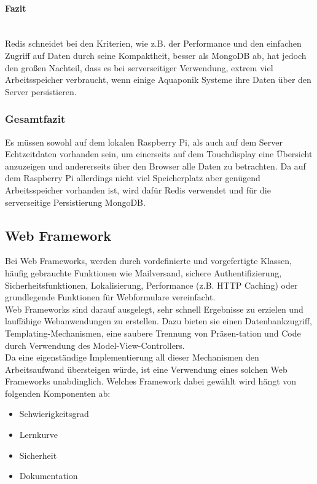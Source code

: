 \paragraph{Fazit} \mbox{}\\
Redis schneidet bei den Kriterien, wie z.B. der Performance und den einfachen Zugriff auf Daten durch
seine Kompaktheit, besser als MongoDB ab, hat jedoch den gro{\ss}en Nachteil, dass es bei serverseitiger Verwendung, extrem viel Arbeitsspeicher verbraucht, wenn einige Aquaponik Systeme ihre Daten \"uber den Server persistieren.

\subsubsection{Gesamtfazit}
Es m\"ussen sowohl auf dem lokalen Raspberry Pi, als auch auf dem Server Echtzeitdaten vorhanden sein, um einerseits auf dem Touchdisplay eine \"Ubersicht anzuzeigen und andererseits \"uber den Browser alle Daten zu betrachten. Da auf dem Raspberry Pi allerdings nicht viel Speicherplatz aber gen\"ugend Arbeitsspeicher vorhanden ist, wird daf\"ur Redis verwendet und f\"ur die serverseitige Persistierung MongoDB.
\newpage

\subsection{Web Framework}
Bei Web Frameworks, werden durch vordefinierte und vorgefertigte Klassen, h\"aufig gebrauchte Funktionen wie Mailversand, sichere Authentifizierung, Sicherheitsfunktionen, Lokalisierung, Performance (z.B. HTTP Caching) oder grundlegende Funktionen f\"ur Webformulare vereinfacht. \\
Web Frameworks sind darauf ausgelegt, sehr schnell Ergebnisse zu erzielen und lauff\"ahige Webanwendungen zu erstellen. Dazu bieten sie einen Datenbankzugriff, Templating-Mechanismen, eine saubere Trennung von Pr\"asen-tation und Code durch Verwendung des Model-View-Controllers. \\
Da eine eigenst\"andige Implementierung all dieser Mechanismen den Arbeitsaufwand \"ubersteigen w\"urde, ist eine Verwendung eines solchen Web Frameworks unabdinglich. Welches Framework dabei gew\"ahlt wird h\"angt von folgenden Komponenten ab:
\begin{itemize}
\item Schwierigkeitsgrad
\item Lernkurve
\item Sicherheit
\item Dokumentation
\end{itemize}
\newpage
